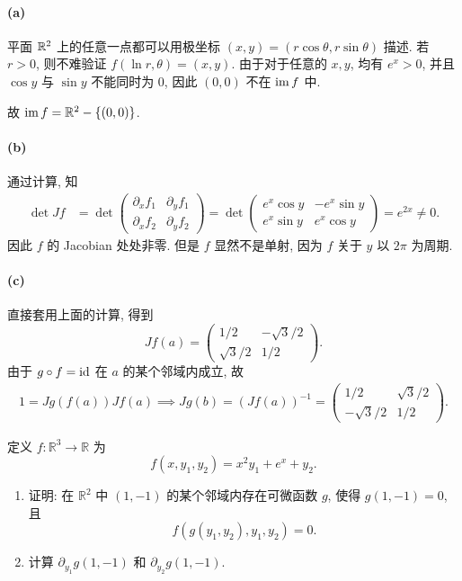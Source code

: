 \documentclass{article}
\begin{document}
\begin{solution}
	\paragraph{(a)} 平面 $\mathbb{R}^2$ 上的任意一点都可以用极坐标 $(x,y) = (r \cos\theta, r\sin\theta)$ 描述. 若 $r>0$, 则不难验证 $f(\ln r, \theta) = (x, y)$. 由于对于任意的 $x, y$, 均有 $e^x > 0$, 并且 $\cos y$ 与 $\sin y$ 不能同时为 $0$, 因此 $(0,0)$ 不在 $\operatorname{im} f$ 中. 
	
	故 $\operatorname{im} f = \mathbb{R}^2 - \{(0,0)\}$.

	\paragraph{(b)} 通过计算, 知
	\begin{align*}
		\det Jf
		&= \det \begin{pmatrix}
			\partial_x f_1 & \partial_y f_1 \\
			\partial_x f_2 & \partial_y f_2
		\end{pmatrix}
		= \det \begin{pmatrix}
			e^x \cos y & - e^x \sin y \\
			e^x \sin y & e^x \cos y
		\end{pmatrix}
		= e^{2x} \neq 0.
	\end{align*}
	因此 $f$ 的 Jacobian 处处非零. 但是 $f$ 显然不是单射, 因为 $f$ 关于 $y$ 以 $2\pi$ 为周期.

	\paragraph{(c)} 直接套用上面的计算, 得到
	\[ J f(a) = \begin{pmatrix}
		1/2 & -\sqrt{3}/2 \\
		\sqrt{3}/2 & 1/2
	\end{pmatrix}. \]
	由于 $g \circ f = \operatorname{id}$ 在 $a$ 的某个邻域内成立, 故
	\begin{align*}
		1 = Jg(f(a)) Jf(a)
		\implies
		Jg(b) = (Jf(a))^{-1} = \begin{pmatrix}
			1/2 & \sqrt{3}/2 \\
			-\sqrt{3}/2 & 1/2
		\end{pmatrix}.
	\end{align*}
\end{solution}



\begin{problem}
  定义 $f:\mathbb{R}^3\to\mathbb{R}$ 为
  \[
    f(x,y_1,y_2)=x^2y_1+e^x+y_2.
  \]
  \begin{enumerate}
    \item[(a)] 证明: 在 $\mathbb{R}^2$ 中 $(1,-1)$ 的某个邻域内存在可微函数 $g$, 使得 $g(1,-1)=0$, 且
      \[
        f(g(y_1,y_2),y_1,y_2)=0.
      \]
    \item[(b)] 计算 $\partial_{y_1}g(1,-1)$ 和 $\partial_{y_2}g(1,-1)$.
  \end{enumerate}
\end{problem}
\end{document}
